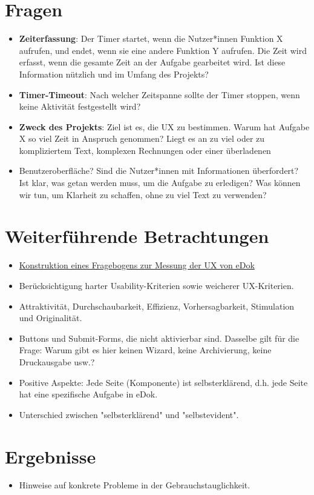 \documentclass[12pt,oneside]{article}
\begin{document}
\section{Fragen}
\begin{itemize}
\item \textbf{Zeiterfassung}: Der Timer startet, wenn die Nutzer*innen Funktion X aufrufen, und endet, wenn sie eine andere Funktion Y aufrufen. Die Zeit wird erfasst, wenn die gesamte Zeit an der Aufgabe gearbeitet wird. Ist diese Information nützlich und im Umfang des Projekts?
\item \textbf{Timer-Timeout}: Nach welcher Zeitspanne sollte der Timer stoppen, wenn keine Aktivität festgestellt wird?
\item \textbf{Zweck des Projekts}: Ziel ist es, die UX zu bestimmen. Warum hat Aufgabe X so viel Zeit in Anspruch genommen? Liegt es an zu viel oder zu kompliziertem Text, komplexen Rechnungen oder einer überladenen
 \item Benutzeroberfläche? Sind die Nutzer*innen mit Informationen überfordert? Ist klar, was getan werden muss, um die Aufgabe zu erledigen? Was können wir tun, um Klarheit zu schaffen, ohne zu viel Text zu verwenden?
\end{itemize}
\section{Weiterführende Betrachtungen}
\begin{itemize}
\item \href{https://dl.gi.de/server/api/core/bitstreams/be764ccf-d6c1-45a3-9d7d-00ad897aff3b/content}{Konstruktion eines Fragebogens zur Messung der UX von eDok}
\item Berücksichtigung harter Usability-Kriterien sowie weicherer UX-Kriterien.
\item Attraktivität, Durchschaubarkeit, Effizienz, Vorhersagbarkeit, Stimulation und Originalität.
\item Buttons und Submit-Forms, die nicht aktivierbar sind. Dasselbe gilt für die Frage: Warum gibt es hier keinen Wizard, keine Archivierung, keine Druckausgabe usw.?
\item Positive Aspekte: Jede Seite (Komponente) ist selbsterklärend, d.h. jede Seite hat eine spezifische Aufgabe in eDok.
\item Unterschied zwischen "selbsterklärend" und "selbstevident".
\end{itemize}
\section{Ergebnisse}
\begin{itemize}
\item Hinweise auf konkrete Probleme in der Gebrauchstauglichkeit.
\end{itemize}
\end{document}
